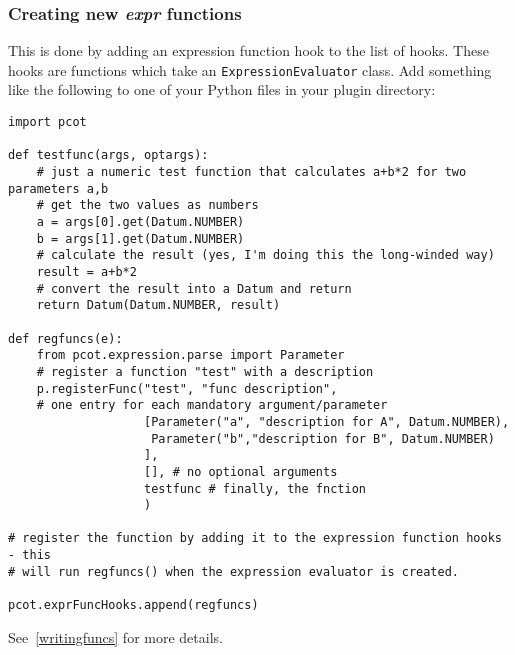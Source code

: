 \subsubsection{Creating new \emph{expr} functions}
This is done by adding an expression function hook to the list of hooks. These
hooks are functions which take an \texttt{ExpressionEvaluator} class. Add something
like the following to one of your Python files in your plugin directory:
\begin{lstlisting}
import pcot

def testfunc(args, optargs):
    # just a numeric test function that calculates a+b*2 for two parameters a,b
    # get the two values as numbers
    a = args[0].get(Datum.NUMBER)
    b = args[1].get(Datum.NUMBER)
    # calculate the result (yes, I'm doing this the long-winded way)
    result = a+b*2
    # convert the result into a Datum and return
    return Datum(Datum.NUMBER, result)

def regfuncs(e):
    from pcot.expression.parse import Parameter
    # register a function "test" with a description
    p.registerFunc("test", "func description",
    # one entry for each mandatory argument/parameter
                   [Parameter("a", "description for A", Datum.NUMBER),
                    Parameter("b","description for B", Datum.NUMBER)
                   ],
                   [], # no optional arguments
                   testfunc # finally, the fnction
                   )

# register the function by adding it to the expression function hooks - this
# will run regfuncs() when the expression evaluator is created.

pcot.exprFuncHooks.append(regfuncs)
\end{lstlisting}
See~\ref{writingfuncs} for more details.

